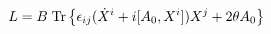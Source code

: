 \begin{equation}
L=B \; {\rm{Tr}}
\left\{
\epsilon_{ij} (\dot{X}^i +i[A_0,X^i])X^j + 2\theta A_0
\right\}
\end{equation}

